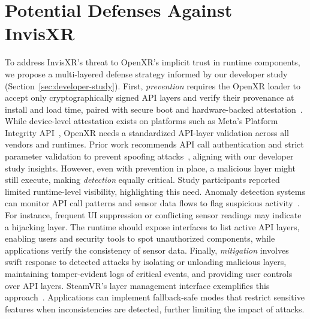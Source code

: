 \documentclass[letterpaper,twocolumn,10pt]{article}
\begin{document}
\section{Potential Defenses Against InvisXR}
\label{sec:defense-strategy}
To address InvisXR's threat to OpenXR's implicit trust in runtime components, we propose a multi-layered defense strategy informed by our developer study (Section~\ref{sec:developer-study}). First, \emph{prevention} requires the OpenXR loader to accept only cryptographically signed API layers and verify their provenance at install and load time, paired with secure boot and hardware-backed attestation~\cite{caulfield2023acfa}. While device-level attestation exists on platforms such as Meta's Platform Integrity API~\cite{meta2023attestation}, OpenXR needs a standardized API-layer validation across all vendors and runtimes. Prior work recommends API call authentication and strict parameter validation to prevent spoofing attacks~\cite{yang2024inception}, aligning with our developer study insights. However, even with prevention in place, a malicious layer might still execute, making \emph{detection} equally critical. Study participants reported limited runtime-level visibility, highlighting this need. Anomaly detection systems can monitor API call patterns and sensor data flows to flag suspicious activity~\cite{el2024cybersecurity}. For instance, frequent UI suppression or conflicting sensor readings may indicate a hijacking layer. The runtime should expose interfaces to list active API layers, enabling users and security tools to spot unauthorized components, while applications verify the consistency of sensor data. Finally, \emph{mitigation} involves swift response to detected attacks by isolating or unloading malicious layers, maintaining tamper-evident logs of critical events, and providing user controls over API layers. SteamVR's layer management interface exemplifies this approach~\cite{manus2024openxrdisable}. Applications can implement fallback-safe modes that restrict sensitive features when inconsistencies are detected, further limiting the impact of attacks.
\end{document}
